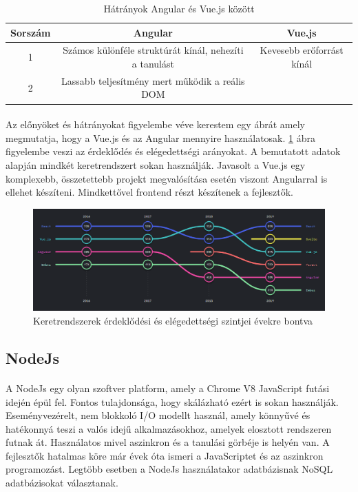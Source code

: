 	\begin{table}
		\begin{center}
			\caption{Hátrányok Angular és Vue.js között \cite{vuevsang}}
			\label{tab:table2}
			\begin{tabular}{c|c|c} 
				\textbf{Sorszám} & \textbf{Angular} & \textbf{Vue.js}\\
				\hline
				1 & Számos különféle struktúrát kínál, nehezíti a tanulást & Kevesebb erőforrást kínál\\
				\hline
				2 & Lassabb teljesítmény mert működik a reális DOM &  \\
			\end{tabular}
		\end{center}
	\end{table}
	\paragraph{}
	Az előnyöket és hátrányokat figyelembe véve kerestem egy ábrát amely megmutatja, hogy a Vue.js és az Angular mennyire használatosak. \ref{fig:vueang} ábra figyelembe veszi az érdeklődés és elégedettségi arányokat. A bemutatott adatok alapján mindkét keretrendszert sokan használják. Javasolt a Vue.js egy komplexebb, összetettebb projekt megvalósítása esetén viszont Angularral is ellehet készíteni. Mindkettővel frontend részt készítenek a fejlesztők.
	
	\begin{figure}
		\centering
		\includegraphics[scale=0.6]{figures/images/vueang.png}
		\caption{Keretrendszerek érdeklődési és elégedettségi szintjei évekre bontva \cite{vueanginterest}}
		\label{fig:vueang}
	\end{figure}
	
	\subsection{NodeJs}
	\paragraph{} 
	A NodeJs egy olyan szoftver platform, amely a Chrome V8 JavaScript futási idején épül fel. Fontos tulajdonsága, hogy skálázható ezért is sokan használják. Eseményvezérelt, nem blokkoló I/O modellt használ, amely könnyűvé és hatékonnyá teszi a valós idejű alkalmazásokhoz, amelyek elosztott rendszeren futnak át. Használatos mivel aszinkron és a tanulási görbéje is helyén van. A fejlesztők hatalmas köre már évek óta ismeri a JavaScriptet és az aszinkron programozást. Legtöbb esetben a NodeJs használatakor adatbázisnak NoSQL adatbázisokat választanak.\cite{js2016node}
	
